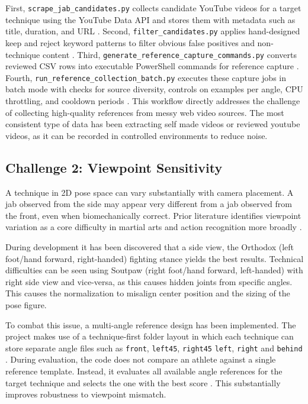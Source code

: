 \documentclass[12pt]{article}
\begin{document}
First, \texttt{scrape\_jab\_candidates.py} collects candidate YouTube videos for a target technique using the YouTube Data API and stores them with metadata such as title, duration, and URL \cite{projectScrape}. Second, \texttt{filter\_candidates.py} applies hand-designed keep and reject keyword patterns to filter obvious false positives and non-technique content \cite{projectFilter}. Third, \texttt{generate\_reference\_capture\_commands.py} converts reviewed CSV rows into executable PowerShell commands for reference capture \cite{projectGenerate}. Fourth, \texttt{run\_reference\_collection\_batch.py} executes these capture jobs in batch mode with checks for source diversity, controls on examples per angle, CPU throttling, and cooldown periods \cite{projectRunBatch}. This workflow directly addresses the challenge of collecting high-quality references from messy web video sources.
The most consistent type of data has been extracting self made videos or reviewed youtube videos, as it can be recorded in controlled environments to reduce noise.

\subsection{Challenge 2: Viewpoint Sensitivity}
A technique in 2D pose space can vary substantially with camera placement. A jab observed from the side may appear very different from a jab observed from the front, even when biomechanically correct. Prior literature identifies viewpoint variation as a core difficulty in martial arts and action recognition more broadly \cite{wu2024sthka,echeverria2021pose}.

During development it has been discovered that a side view, the Orthodox (left foot/hand forward, right-handed) fighting stance yields the best results. Technical difficulties can be seen using Soutpaw (right foot/hand forward, left-handed) with right side view and vice-versa, as this causes hidden joints from specific angles. This causes the normalization to misalign center position and the sizing of the pose figure.

To combat this issue, a multi-angle reference design has been implemented. The project makes use of a technique-first folder layout in which each technique can store separate angle files such as \texttt{front}, \texttt{left45}, \texttt{right45} \texttt{left}, \texttt{right} and \texttt{behind }\cite{projectReadme}. During evaluation, the code does not compare an athlete against a single reference template. Instead, it evaluates all available angle references for the target technique and selects the one with the best score \cite{projectActionRecognition}. This substantially improves robustness to viewpoint mismatch.
\end{document}
